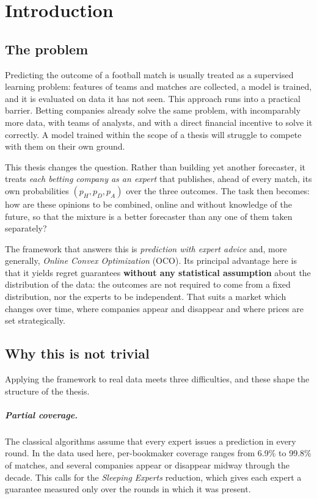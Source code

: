 \documentclass[12pt,a4paper,oneside]{report}
\renewcommand{\_}{\oldunderscore\allowbreak}
\theoremstyle{definition}
\theoremstyle{plain}
\theoremstyle{remark}
\begin{document}
\chapter{Introduction}

\section{The problem}

Predicting the outcome of a football match is usually treated as a supervised learning
problem: features of teams and matches are collected, a model is trained, and it is evaluated
on data it has not seen. This approach runs into a practical barrier. Betting companies
already solve the same problem, with incomparably more data, with teams of analysts, and with
a direct financial incentive to solve it correctly. A model trained within the scope of a
thesis will struggle to compete with them on their own ground.

This thesis changes the question. Rather than building yet another forecaster, it treats
\emph{each betting company as an expert} that publishes, ahead of every match, its own
probabilities $(p_H, p_D, p_A)$ over the three outcomes. The task then becomes: how are these
opinions to be combined, online and without knowledge of the future, so that the mixture is a
better forecaster than any one of them taken separately?

The framework that answers this is \emph{prediction with expert advice} and, more generally,
\emph{Online Convex Optimization} (OCO). Its principal advantage here is that it yields regret
guarantees \textbf{without any statistical assumption} about the distribution of the data: the
outcomes are not required to come from a fixed distribution, nor the experts to be
independent. That suits a market which changes over time, where companies appear and
disappear and where prices are set strategically.

\section{Why this is not trivial}

Applying the framework to real data meets three difficulties, and these shape the structure of
the thesis.

\paragraph{Partial coverage.} The classical algorithms assume that every expert issues a
prediction in every round. In the data used here, per-bookmaker coverage ranges from 6.9\% to
99.8\% of matches, and several companies appear or disappear midway through the decade. This
calls for the \emph{Sleeping Experts} reduction, which gives each expert a guarantee measured
only over the rounds in which it was present.
\end{document}
